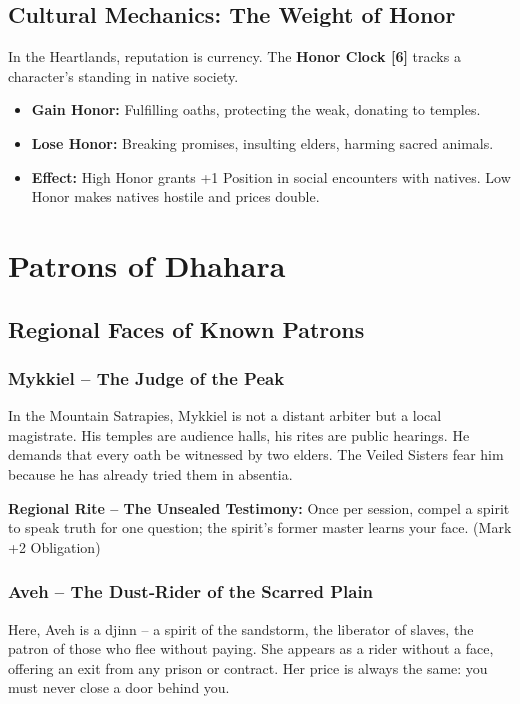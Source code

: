 \documentclass[11pt]{book}
\begin{document}
\section{Cultural Mechanics: The Weight of Honor}
In the Heartlands, reputation is currency. The \textbf{Honor Clock [6]} tracks a character's standing in native society.
\begin{itemize}
    \item \textbf{Gain Honor:} Fulfilling oaths, protecting the weak, donating to temples.
    \item \textbf{Lose Honor:} Breaking promises, insulting elders, harming sacred animals.
    \item \textbf{Effect:} High Honor grants +1 Position in social encounters with natives. Low Honor makes natives hostile and prices double.
\end{itemize}

\clearpage
\chapter{Patrons of Dhahara}

\section{Regional Faces of Known Patrons}

\subsection{Mykkiel -- The Judge of the Peak}
In the Mountain Satrapies, Mykkiel is not a distant arbiter but a local magistrate. His temples are audience halls, his rites are public hearings. He demands that every oath be witnessed by two elders. The Veiled Sisters fear him because he has already tried them in absentia.

\textbf{Regional Rite -- The Unsealed Testimony:} Once per session, compel a spirit to speak truth for one question; the spirit's former master learns your face. (Mark +2 Obligation)

\subsection{Aveh -- The Dust‑Rider of the Scarred Plain}
Here, Aveh is a djinn -- a spirit of the sandstorm, the liberator of slaves, the patron of those who flee without paying. She appears as a rider without a face, offering an exit from any prison or contract. Her price is always the same: you must never close a door behind you.
\end{document}
